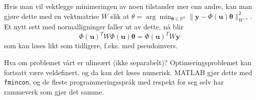 Hvis man vil vektlegge minimeringen av noen tilstander mer enn andre, kan man gjøre dette med en vektmatrise $W$ slik at $\theta=\arg \min _{\boldsymbol{\theta} \in \mathbb{R}^{n}}\|\boldsymbol{y}-\Phi(\boldsymbol{u}) \boldsymbol{\theta}\|_{W^{-1}}^{2}
$. Et nytt sett med normalligninger faller ut av dette, nå blir 
\begin{equation}
\Phi(\boldsymbol{u})^{T} W \Phi(\boldsymbol{u}) \boldsymbol{\theta}=\Phi(\boldsymbol{u})^{T} W \boldsymbol{y}
\end{equation}
som kan løses likt som tidligere, f.eks. med pseudoinvers.

Hva om problemet vårt er ulineært (ikke separabelt)? Optimeringsproblemet kan fortsatt være veldefinert, og da kan det løses numerisk. MATLAB gjør dette med \texttt{fmincon}, og de fleste programmeringsspråk med respekt for seg selv har rammeverk som gjør det samme.
